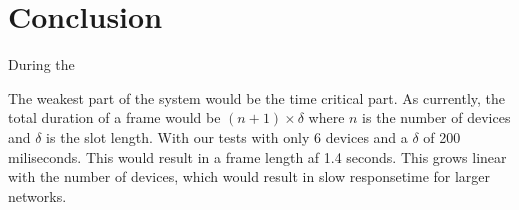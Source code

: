 \chapter{Conclusion}



During the 




The weakest part of the system would be the time critical part.
As currently, the total duration of a frame would be $(n + 1) \times \delta$ where $n$ is the number of devices and $\delta$ is the slot length.
With our tests with only 6 devices and a $\delta$ of 200 miliseconds.
This would result in a frame length af 1.4 seconds.
This grows linear with the number of devices, which would result in slow responsetime for larger networks.




